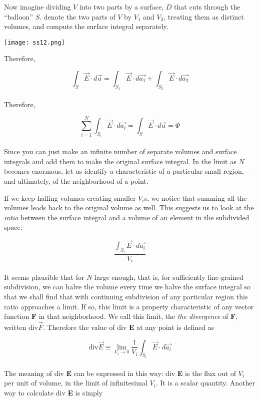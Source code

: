 \documentclass[svgnames]{article}
\begin{document}
Now imagine dividing $V$ into two parts by a surface, $D$ that cuts through the
``balloon'' $S$. denote the two parts of $V$ by $V_1$ and $V_2$, treating them
as distinct volumes, and compute the surface integral separately.

\begin{center}
\texttt{[image: ss12.png]}
\end{center} 


Therefore, 

\[ \int_S \vec{E} \cdot d\vec{a} = \int_{S_1} \vec{E} \cdot d\vec{a_1}
+ \int_{S_2} \vec{E} \cdot d\vec{a_2} \] \\

Therefore, 

\[ \sum_{i=1}^N \int_{S_i} \vec{E} \cdot d\vec{a_i} = \int_S \vec{E} \cdot d\vec{a} = \Phi \] \\ 

Since you can just make an infinite number of separate volumes and surface
integrals and add them to make the original surface integral. In the limit as
$N$ becomes enormous, let us identify a characteristic of a particular small
region, -- and ultimately, of the neighborhood of a point.

If we keep halfing volumes creating smaller $V_i$s, we notice that summing all
the volumes leads back to the original volume as well. This suggests us to look
at the \textit{ratio} between the surface integral and a volume of an element
in the subdivided space:

\[ \frac{\int_{S_i} \vec{E} \cdot d\vec{a_i}}{V_i} \] \\

It seems plausible that for $N$ large enough, that is, for sufficiently
fine-grained subdivision, we can halve the volume every time we halve the
surface integral so that we shall find that with continuing subdivision of any
particular region this ratio approaches a limit. If so, this limit is
a property characteristic of any vector function \textbf{F} in that
neighborhood. We call this limit, the \textit{the divergence} of \textbf{F},
written $\text{div} \vec{F}$. Therefore the value of div \textbf{E} at any
point is defined as

\[ \text{div} \vec{E} \equiv \lim_{V_i \to 0} \frac{1}{V_i} \int_{S_i} \vec{E} \cdot d\vec{a_i} \] \\

The meaning of div \textbf{E} can be expressed in this way: div \textbf{E} is
the flux out of $V_i$ per unit of volume, in the limit of infinitesimal $V_i$.
It is a scalar quantity. Another way to calculate div \textbf{E} is simply
\end{document}
